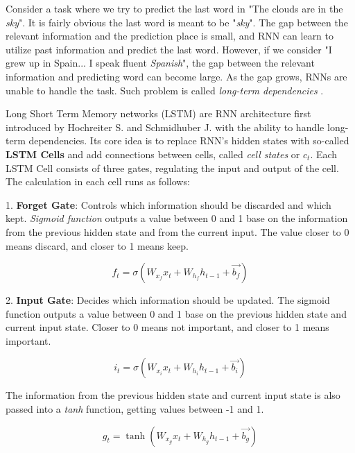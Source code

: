 Consider a task where we try to predict the last word in "The clouds are in the \textit{sky}". It is fairly obvious the last word is meant to be "\textit{sky}". The gap between the relevant information and the prediction place is small, and RNN can learn to utilize past information and predict the last word. However, if we consider "I grew up in Spain... I speak fluent \textit{Spanish}", the gap between the relevant information and predicting word can become large. As the gap grows, RNNs are unable to handle the task. Such problem is called \textit{long-term dependencies} \cite{colahLSTM}.

Long Short Term Memory networks (LSTM) are RNN architecture first introduced by Hochreiter S. and Schmidhuber J. \cite{hochreiterLSTM} with the ability to handle long-term dependencies. Its core idea is to replace RNN's hidden states with so-called \textbf{LSTM Cells} and add connections between cells, called \textit{cell states} or $c_{t}$. Each LSTM Cell consists of three gates, regulating the input and output of the cell. The calculation in each cell runs as follows:

1. \textbf{Forget Gate}: Controls which information should be discarded and which kept. \textit{Sigmoid function} outputs a value between 0 and 1 base on the information from the previous hidden state and from the current input. The value closer to 0 means discard, and closer to 1 means keep.

\begin{equation}
    {f_t = \sigma(W_{x_f}x_t + W_{h_f}h_{t-1}+\vec{b_f})}
\end{equation}

2. \textbf{Input Gate}: Decides which information should be updated. The sigmoid function outputs a value between 0 and 1 base on the previous hidden state and current input state. Closer to 0 means not important, and closer to 1 means important.

\begin{equation}
    {i_t = \sigma(W_{x_i}x_t + W_{h_i}h_{t-1}+\vec{b_i})}
\end{equation}

The information from the previous hidden state and current input state is also passed into a \textit{tanh} function, getting values between -1 and 1.

\begin{equation}
    {g_t = \tanh(W_{x_g}x_t + W_{h_g}h_{t-1}+\vec{b_g})}
\end{equation}

